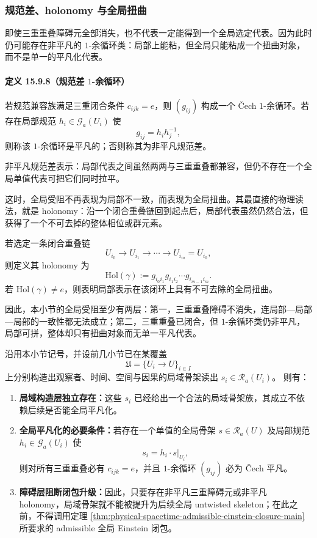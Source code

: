 \subsubsection{规范差、holonomy 与全局扭曲}

即使三重重叠障碍元全部消失，也不代表一定能得到一个全局选定代表。因为此时仍可能存在非平凡的 \(1\)-余循环类：局部上能粘，但全局只能粘成一个扭曲对象，而不是单一的平凡化代表。

\paragraph{定义 15.9.8（规范差 \(1\)-余循环）}
若规范兼容族满足三重闭合条件 \(c_{ijk}=e\)，则 \((g_{ij})\) 构成一个 Čech \(1\)-余循环。若存在局部规范 \(h_i\in\mathscr G_a(U_i)\) 使
\[
g_{ij}=h_i h_j^{-1},
\]
则称该 \(1\)-余循环是平凡的；否则称其为非平凡规范差。

非平凡规范差表示：局部代表之间虽然两两与三重重叠都兼容，但仍不存在一个全局单值代表可把它们同时拉平。

这时，全局受阻不再表现为局部不一致，而表现为全局扭曲。其最直接的物理读法，就是 holonomy：沿一个闭合重叠链回到起点后，局部代表虽然仍然合法，但获得了一个不可去掉的整体相位或群元素。

若选定一条闭合重叠链
\[
U_{i_0}\to U_{i_1}\to \cdots \to U_{i_m}=U_{i_0},
\]
则定义其 holonomy 为
\[
\mathrm{Hol}(\gamma):=
g_{i_0 i_1}g_{i_1 i_2}\cdots g_{i_{m-1}i_m}.
\]
若 \(\mathrm{Hol}(\gamma)\neq e\)，则表明局部表示在该闭环上具有不可去除的全局扭曲。

因此，本小节的全局受阻至少有两层：第一，三重重叠障碍不消失，连局部—局部—局部的一致性都无法成立；第二，三重重叠已闭合，但 \(1\)-余循环类仍非平凡，局部可拼，整体却只有扭曲对象而无单一平凡代表。

\begin{proposition}[局域骨架先于全局平凡化闭包]\label{prop:physical-spacetime-local-skeleton-before-global-trivialization}
沿用本小节记号，并设前几小节已在某覆盖
\[
\mathfrak U=\{U_i\to U\}_{i\in I}
\]
上分别构造出观察者、时间、空间与因果的局域骨架读出 \(s_i\in\mathscr R_a(U_i)\)。
则有：
\begin{enumerate}
  \item \textbf{局域构造层独立存在：}这些 \(s_i\) 已经给出一个合法的局域骨架族，其成立不依赖后续是否能全局平凡化。
  \item \textbf{全局平凡化的必要条件：}若存在一个单值的全局骨架 \(s\in\mathscr R_a(U)\) 及局部规范 \(h_i\in\mathscr G_a(U_i)\) 使
  \[
  s_i=h_i\cdot s|_{U_i},
  \]
  则对所有三重重叠必有 \(c_{ijk}=e\)，并且 \(1\)-余循环 \((g_{ij})\) 必为 Čech 平凡。
  \item \textbf{障碍层阻断闭包升级：}因此，只要存在非平凡三重障碍元或非平凡 holonomy，局域骨架就不能被提升为后续全局 untwisted skeleton；在此之前，不得调用定理 \ref{thm:physical-spacetime-admissible-einstein-closure-main} 所要求的 admissible 全局 Einstein 闭包。
\end{enumerate}
\end{proposition}

